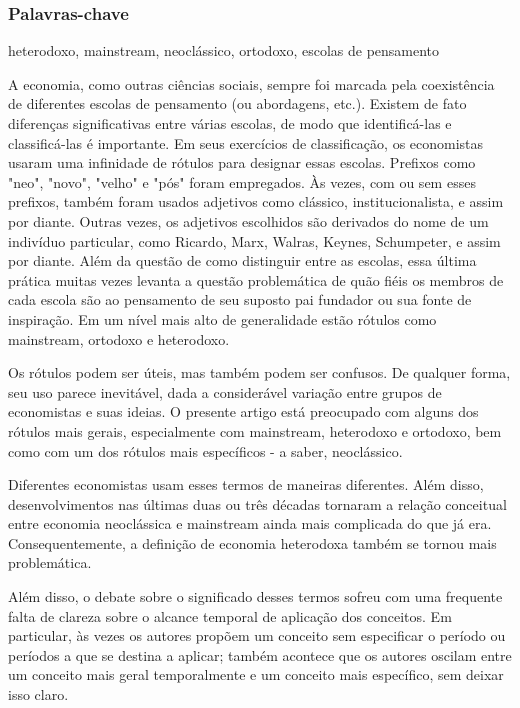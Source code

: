 \documentclass[a4paper,12pt]{article}[abntex2]
\begin{document}
\subsubsection{\textbf{Palavras-chave}}

heterodoxo, mainstream, neoclássico, ortodoxo, escolas de pensamento

A economia, como outras ciências sociais, sempre foi marcada pela coexistência de diferentes escolas de pensamento (ou abordagens, etc.). Existem de fato diferenças significativas entre várias escolas, de modo que identificá-las e classificá-las é importante. Em seus exercícios de classificação, os economistas usaram uma infinidade de rótulos para designar essas escolas. Prefixos como "neo", "novo", "velho" e "pós" foram empregados. Às vezes, com ou sem esses prefixos, também foram usados adjetivos como clássico, institucionalista, e assim por diante. Outras vezes, os adjetivos escolhidos são derivados do nome de um indivíduo particular, como Ricardo, Marx, Walras, Keynes, Schumpeter, e assim por diante. Além da questão de como distinguir entre as escolas, essa última prática muitas vezes levanta a questão problemática de quão fiéis os membros de cada escola são ao pensamento de seu suposto pai fundador ou sua fonte de inspiração. Em um nível mais alto de generalidade estão rótulos como mainstream, ortodoxo e heterodoxo.

Os rótulos podem ser úteis, mas também podem ser confusos. De qualquer forma, seu uso parece inevitável, dada a considerável variação entre grupos de economistas e suas ideias. O presente artigo está preocupado com alguns dos rótulos mais gerais, especialmente com mainstream, heterodoxo e ortodoxo, bem como com um dos rótulos mais específicos - a saber, neoclássico.

Diferentes economistas usam esses termos de maneiras diferentes. Além disso, desenvolvimentos nas últimas duas ou três décadas tornaram a relação conceitual entre economia neoclássica e mainstream ainda mais complicada do que já era. Consequentemente, a definição de economia heterodoxa também se tornou mais problemática.

Além disso, o debate sobre o significado desses termos sofreu com uma frequente falta de clareza sobre o alcance temporal de aplicação dos conceitos. Em particular, às vezes os autores propõem um conceito sem especificar o período ou períodos a que se destina a aplicar; também acontece que os autores oscilam entre um conceito mais geral temporalmente e um conceito mais específico, sem deixar isso claro.
\end{document}
